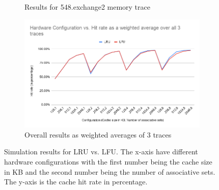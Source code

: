 \documentclass[letterpaper, 11pt]{article}
\begin{document}
\begin{figure}[ht!]
\begin{subfigure}[b]{.48\linewidth}
		\caption{Results for 548.exchange2 memory trace}
		\label{fig2c}
	\end{subfigure}
	\begin{subfigure}[b]{.48\linewidth}
		\includegraphics[width=\textwidth]{all_weighted_avg_results.png}
		\caption{Overall results as weighted averages of 3 traces}
		\label{fig2d}
	\end{subfigure}
	\caption{Simulation results for LRU vs. LFU. The x-axis have different hardware configurations with the first number being the cache size in KB and the second number being the number of associative sets. The y-axis is the cache hit rate in percentage.}
\end{figure}
\end{document}
